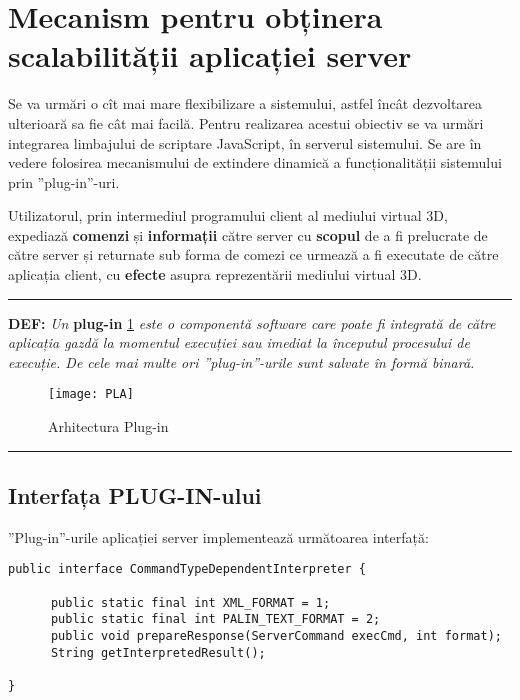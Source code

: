 \section{Mecanism pentru obținera \\ scalabilității aplicației server}

\par Se va urmări o cît mai mare flexibilizare a sistemului, astfel încât dezvoltarea ulterioară sa fie cât mai facilă. Pentru realizarea acestui obiectiv se va urmări integrarea limbajului de scriptare JavaScript, în serverul sistemului. Se are în vedere folosirea mecanismului de extindere dinamică a funcționalității sistemului prin ”plug-in”-uri. 
\par Utilizatorul, prin intermediul programului client al mediului virtual 3D, expediază \textbf{comenzi} și \textbf{informații} către server cu \textbf{scopul} de a fi prelucrate de către server și returnate sub forma de comezi ce urmează a fi executate de către aplicația client, cu \textbf{efecte} asupra reprezentării mediului virtual 3D.

\begin{center}
\rule{150mm}{.1pt}
\end{center}

\par \textbf{DEF:} \textit{Un} \textbf{plug-in} \ref{fig:imag35} \textit{este o componentă software care poate fi integrată de către aplicația gazdă la momentul execuției sau imediat la începutul procesului de execuție. De cele mai multe ori ”plug-in”-urile sunt salvate în formă binară.}

\begin{figure}[h]
    \centering
    \texttt{[image: PLA]}
    \caption{Arhitectura Plug-in}
    \label{fig:imag35}
\end{figure}

\begin{center}
\rule{150mm}{.1pt}
\end{center}

\subsection{Interfața PLUG-IN-ului}
\par ”Plug-in”-urile aplicației server implementează următoarea interfață:
\begin{verbatim}
public interface CommandTypeDependentInterpreter {
      
      public static final int XML_FORMAT = 1;
      public static final int PALIN_TEXT_FORMAT = 2;
      public void prepareResponse(ServerCommand execCmd, int format);
      String getInterpretedResult();

}
\end{verbatim}

